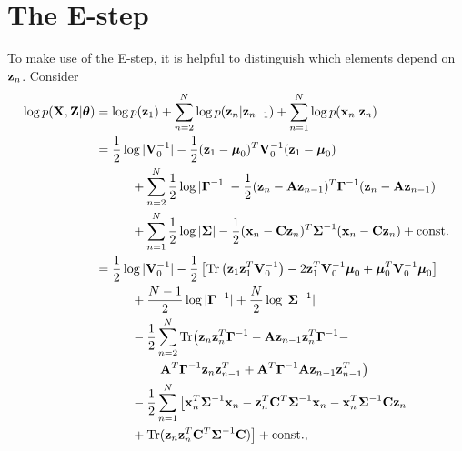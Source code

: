 \documentclass[12pt, oneside]{book}
\numberwithin{equation}{section}
\newcommand{\x}{{\bf x}}
\newcommand{\z}{{\bf z}}
\begin{document}
{\section{The E-step} \label{subsec:e-step}
To make use of the E-step, it is helpful to distinguish which elements depend on $\z_n$. Consider
\begin{align}
	\log p({\bf X}, {\bf Z}\vert \boldsymbol\theta) &= \log p(\z_1) + \sum_{n=2}^N \log p(\z_n\vert \z_{n-1}) + \sum_{n=1}^N \log p(\x_n\vert \z_n)\\
	   &=\frac{1}{2}\log\vert{\bf V}_0^{-1}\vert - \frac{1}{2}(\z_1 - \boldsymbol\mu_0)^T{\bf V}_0^{-1}(\z_1 - \boldsymbol\mu_0) \nonumber \\
	   &\hspace{1cm}+ \sum_{n=2}^N \frac{1}{2}\log\vert\boldsymbol\Gamma^{-1}\vert - \frac{1}{2}(\z_n - {\bf A z}_{n-1})^T\boldsymbol{\Gamma}^{-1}(\z_n - {\bf A z}_{n-1}) \nonumber \\
	   &\hspace{1cm}+\sum_{n=1}^N \frac{1}{2}\log\vert\boldsymbol\Sigma\vert -\frac{1}{2}(\x_n - {\bf C z}_n)^T \boldsymbol{\Sigma}^{-1}(\x_n - {\bf C z}_n) + \text{const.}\\
	   &= \frac{1}{2}\log \vert
	  {\bf V}_0^{-1}\vert -\frac{1}{2}\left[\text{Tr}\left(\z_1 \z_1^T {\bf V}_0^{-1}\right) -2 \z_1^T{\bf V}_0^{-1}\boldsymbol\mu_0 + \boldsymbol\mu_0^T {\bf V}_0^{-1}\boldsymbol\mu_0\right] \nonumber \\
	  &\hspace{1cm}+ \frac{N-1}{2}\log\vert\boldsymbol\Gamma^{-1}\vert + \frac{N}{2}\log\vert \boldsymbol\Sigma^{-1}\vert \nonumber \\
	  &\hspace{1cm}-\frac{1}{2} \sum_{n=2}^{N}\text{Tr}\big(\z_n\z_n^T\boldsymbol\Gamma^{-1} -{\bf A} \z_{n-1}\z_n^T\boldsymbol\Gamma^{-1} - \nonumber\\
	  &\hspace{1.8cm}{\bf A}^T\boldsymbol{\Gamma}^{-1}\z_n\z_{n-1}^T + {\bf A}^T \boldsymbol\Gamma^{-1}{\bf A}\z_{n-1}\z_{n-1}^T\big) \nonumber\\
	  &\hspace{1cm}-\frac{1}{2}\sum_{n=1}^N\big[\x_n^T\boldsymbol{\Sigma}^{-1}\x_n - \z_n^T{\bf C}^T\boldsymbol\Sigma^{-1}\x_n - \x_n^T\boldsymbol{\Sigma}^{-1}{\bf C}\z_n  \\
	  &\hspace{1cm} + \text{Tr}(\z_n\z_n^T{\bf C}^T\boldsymbol\Sigma^{-1}{\bf C})\big] + \text{const.}, \label{eq:complete-log-likelihood}
\end{align}

}
\end{document}
